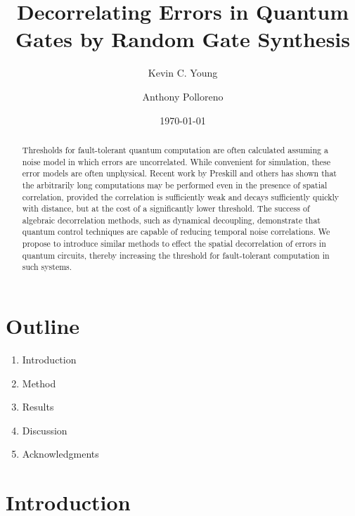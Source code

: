 \documentclass[aps,nofootinbib,pra,notitlepage,twocolumn]{revtex4-1}
\begin{document}
\title{Decorrelating Errors in Quantum Gates by Random Gate Synthesis}

\author{Kevin C. Young}

\author{Anthony Polloreno}

\date{\today}

\begin{abstract}
Thresholds for fault-tolerant quantum computation are often calculated assuming a noise model in which errors are uncorrelated. While convenient for simulation, these error models are often unphysical.  Recent work by Preskill and others has shown that the arbitrarily long computations may be performed even in the presence of spatial correlation, provided the correlation is sufficiently weak and decays sufficiently quickly with distance, but at the cost of a significantly lower threshold. The success of algebraic decorrelation methods, such as dynamical decoupling, demonstrate that quantum control techniques are capable of reducing temporal noise correlations. We propose to introduce similar methods to effect the spatial decorrelation of errors in quantum circuits, thereby increasing the threshold for fault-tolerant computation in such systems.
\end{abstract}

\pacs{}

\maketitle

\section{Outline}
\begin{enumerate}
    \item Introduction
    \item Method
    \item Results
    \item Discussion
    \item Acknowledgments
\end{enumerate}

\section{Introduction}
\end{document}
